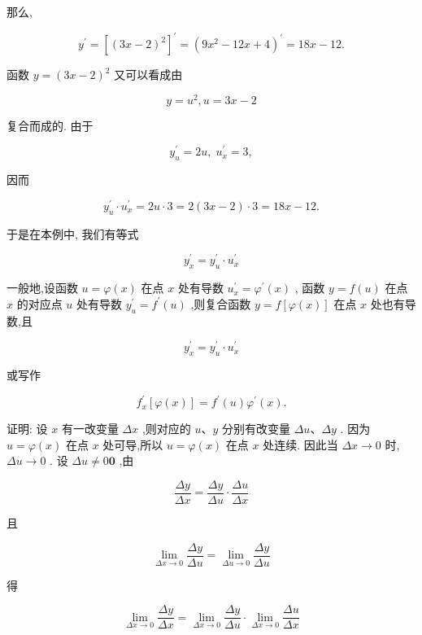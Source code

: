 \documentclass[10pt]{article}
\begin{document}
那么,

\[
{y}^{\prime } = {\left\lbrack {\left( 3x - 2\right) }^{2}\right\rbrack }^{\prime } = {\left( 9{x}^{2} - {12}x + 4\right) }^{\prime } = {18x} - {12}.
\]

函数 \(y = {\left( 3x - 2\right) }^{2}\) 又可以看成由

\[
y = {u}^{2},u = {3x} - 2
\]

复合而成的. 由于

\[
{y}_{u}^{\prime } = {2u},\;{u}_{x}^{\prime } = 3,
\]

因而

\[
{y}_{u}^{\prime } \cdot {u}_{x}^{\prime } = {2u} \cdot 3 = 2\left( {{3x} - 2}\right) \cdot 3 = {18x} - {12}.
\]

于是在本例中, 我们有等式

\[
{y}_{x}^{\prime } = {y}_{u}^{\prime } \cdot {u}_{x}^{\prime }
\]

一般地,设函数 \(u = \varphi \left( x\right)\) 在点 \(x\) 处有导数 \({u}_{x}^{\prime } = {\varphi }^{\prime }\left( x\right)\) , 函数 \(y = f\left( u\right)\) 在点 \(x\) 的对应点 \(u\) 处有导数 \({y}_{u}^{\prime } = {f}^{\prime }\left( u\right)\) ,则复合函数 \(y = f\left\lbrack {\varphi \left( x\right) }\right\rbrack\) 在点 \(x\) 处也有导数,且

\[
{y}_{x}^{\prime } = {y}_{u}^{\prime } \cdot {u}_{x}^{\prime }
\]

或写作

\[
{f}_{x}^{\prime }\left\lbrack {\varphi \left( x\right) }\right\rbrack = {f}^{\prime }\left( u\right) {\varphi }^{\prime }\left( x\right) .
\]

证明: 设 \(x\) 有一改变量 \({\Delta x}\) ,则对应的 \(u\text{、}y\) 分别有改变量 \({\Delta u}\text{、}{\Delta y}\) . 因为 \(u = \varphi \left( x\right)\) 在点 \(x\) 处可导,所以 \(u = \varphi \left( x\right)\) 在点 \(x\) 处连续. 因此当 \({\Delta x} \rightarrow 0\) 时, \({\Delta u} \rightarrow 0\) . 设 \({\Delta u} \neq 0\mathbf{0}\) ,由

\[
\frac{\Delta y}{\Delta x} = \frac{\Delta y}{\Delta u} \cdot \frac{\Delta u}{\Delta x}
\]

且

\[
\mathop{\lim }\limits_{{{\Delta x} \rightarrow 0}}\frac{\Delta y}{\Delta u} = \mathop{\lim }\limits_{{{\Delta u} \rightarrow 0}}\frac{\Delta y}{\Delta u}
\]

得

\[
\mathop{\lim }\limits_{{{\Delta x} \rightarrow 0}}\frac{\Delta y}{\Delta x} = \mathop{\lim }\limits_{{{\Delta x} \rightarrow 0}}\frac{\Delta y}{\Delta u} \cdot \mathop{\lim }\limits_{{{\Delta x} \rightarrow 0}}\frac{\Delta u}{\Delta x}
\]
\end{document}
